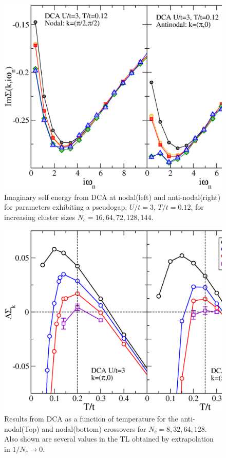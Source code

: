 \documentclass[twocolumn,notitlepage,prl,superscriptaddress,showpacs]{revtex4-1}
\begin{document}
\begin{figure}
\centering
\includegraphics[width=\linewidth]{dca-vsw.eps}
\caption{\label{fig:dcavsw}  Imaginary self energy from DCA at nodal(left) and anti-nodal(right) for parameters exhibiting a pseudogap, $U/t=3$, $T/t=0.12$, for increasing cluster sizes $N_c=16,64,72,128,144$. }
\end{figure}

\begin{figure}
\centering
\includegraphics[width=\linewidth]{fig5_redone.eps}
\caption{\label{fig:U3vsT_AN} Results from DCA as a function of temperature for the anti-nodal(Top) and nodal(bottom) crossovers for $N_c=8,32,64,128$. Also shown are several values in the TL obtained by extrapolation in $1/N_c \to 0$.  }
\end{figure}
\end{document}
